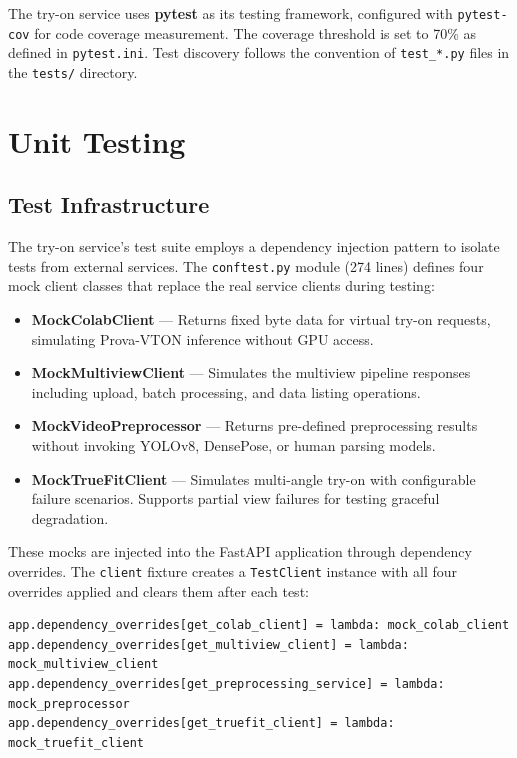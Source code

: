 The try-on service uses \textbf{pytest} as its testing framework, configured with \texttt{pytest-cov} for code coverage measurement. The coverage threshold is set to 70\% as defined in \texttt{pytest.ini}. Test discovery follows the convention of \texttt{test\_*.py} files in the \texttt{tests/} directory.

\section{Unit Testing}
\label{sec:test-unit}

\subsection{Test Infrastructure}

The try-on service's test suite employs a dependency injection pattern to isolate tests from external services. The \texttt{conftest.py} module (274 lines) defines four mock client classes that replace the real service clients during testing:

\begin{itemize}[leftmargin=*]
    \item \textbf{MockColabClient} --- Returns fixed byte data for virtual try-on requests, simulating Prova-VTON inference without GPU access.
    \item \textbf{MockMultiviewClient} --- Simulates the multiview pipeline responses including upload, batch processing, and data listing operations.
    \item \textbf{MockVideoPreprocessor} --- Returns pre-defined preprocessing results without invoking YOLOv8, DensePose, or human parsing models.
    \item \textbf{MockTrueFitClient} --- Simulates multi-angle try-on with configurable failure scenarios. Supports partial view failures for testing graceful degradation.
\end{itemize}

These mocks are injected into the FastAPI application through dependency overrides. The \texttt{client} fixture creates a \texttt{TestClient} instance with all four overrides applied and clears them after each test:

\begin{verbatim}
app.dependency_overrides[get_colab_client] = lambda: mock_colab_client
app.dependency_overrides[get_multiview_client] = lambda: mock_multiview_client
app.dependency_overrides[get_preprocessing_service] = lambda: mock_preprocessor
app.dependency_overrides[get_truefit_client] = lambda: mock_truefit_client
\end{verbatim}

